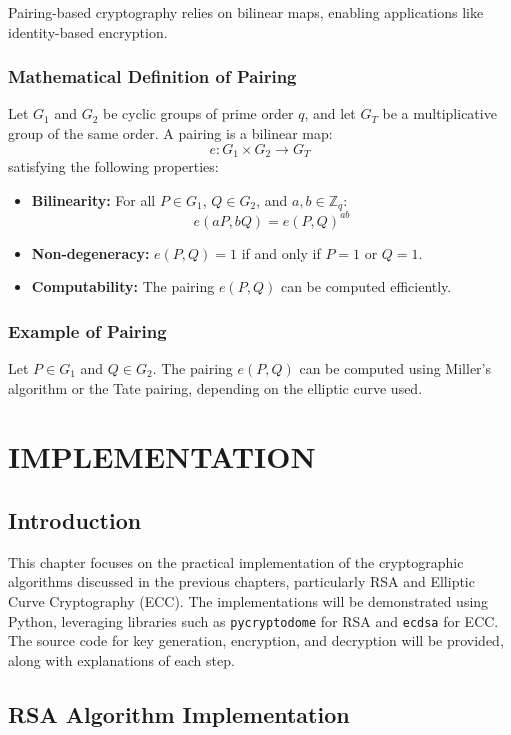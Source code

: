 \documentclass[12pt]{report}
\numberwithin{equation}{chapter}
\begin{document}
Pairing-based cryptography relies on bilinear maps, enabling applications like identity-based encryption.

\subsection*{Mathematical Definition of Pairing}
Let \( G_1 \) and \( G_2 \) be cyclic groups of prime order \( q \), and let \( G_T \) be a multiplicative group of the same order. A pairing is a bilinear map:
\[
e: G_1 \times G_2 \to G_T
\]
satisfying the following properties:
\begin{itemize}
    \item \textbf{Bilinearity:} For all \( P \in G_1 \), \( Q \in G_2 \), and \( a, b \in \mathbb{Z}_q \):
    \[
    e(aP, bQ) = e(P, Q)^{ab}
    \]
    \item \textbf{Non-degeneracy:} \( e(P, Q) = 1 \) if and only if \( P = 1 \) or \( Q = 1 \).
    \item \textbf{Computability:} The pairing \( e(P, Q) \) can be computed efficiently.
\end{itemize}

\subsection*{Example of Pairing}
Let \( P \in G_1 \) and \( Q \in G_2 \). The pairing \( e(P, Q) \) can be computed using Miller's algorithm or the Tate pairing, depending on the elliptic curve used.


\newpage
\chapter{IMPLEMENTATION}

\section{Introduction}

This chapter focuses on the practical implementation of the cryptographic algorithms discussed in the previous chapters, particularly RSA and Elliptic Curve Cryptography (ECC). The implementations will be demonstrated using Python, leveraging libraries such as \texttt{pycryptodome} for RSA and \texttt{ecdsa} for ECC. The source code for key generation, encryption, and decryption will be provided, along with explanations of each step.

\section{RSA Algorithm Implementation}
\end{document}

